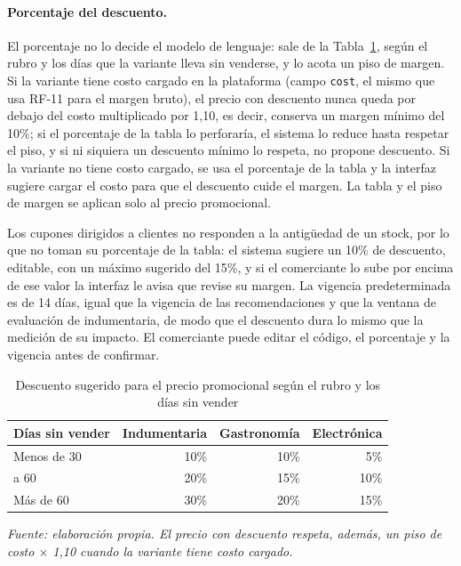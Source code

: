 \paragraph{Porcentaje del descuento.} El porcentaje no lo decide el modelo de lenguaje: sale de la Tabla~\ref{tab:motor-descuentos}, según el rubro y los días que la variante lleva sin venderse, y lo acota un piso de margen. Si la variante tiene costo cargado en la plataforma (campo \texttt{cost}, el mismo que usa RF-11 para el margen bruto), el precio con descuento nunca queda por debajo del costo multiplicado por 1,10, es decir, conserva un margen mínimo del 10\%; si el porcentaje de la tabla lo perforaría, el sistema lo reduce hasta respetar el piso, y si ni siquiera un descuento mínimo lo respeta, no propone descuento. Si la variante no tiene costo cargado, se usa el porcentaje de la tabla y la interfaz sugiere cargar el costo para que el descuento cuide el margen. La tabla y el piso de margen se aplican solo al precio promocional.

Los cupones dirigidos a clientes no responden a la antigüedad de un stock, por lo que no toman su porcentaje de la tabla: el sistema sugiere un 10\% de descuento, editable, con un máximo sugerido del 15\%, y si el comerciante lo sube por encima de ese valor la interfaz le avisa que revise su margen. La vigencia predeterminada es de 14 días, igual que la vigencia de las recomendaciones y que la ventana de evaluación de indumentaria, de modo que el descuento dura lo mismo que la medición de su impacto. El comerciante puede editar el código, el porcentaje y la vigencia antes de confirmar.

\begin{table}[!htbp]
\centering
\caption{Descuento sugerido para el precio promocional según el rubro y los días sin vender}
\label{tab:motor-descuentos}
\renewcommand{\arraystretch}{1.3}
\footnotesize
\setlength{\tabcolsep}{4pt}
\begin{tabular}{|>{\raggedright\arraybackslash}m{4.2cm}|r|r|r|}
\hline
\textbf{Días sin vender} & \textbf{Indumentaria} & \textbf{Gastronomía} & \textbf{Electrónica} \\
\hline
Menos de 30 & 10\% & 10\% & 5\% \\
\hline
30 a 60 & 20\% & 15\% & 10\% \\
\hline
Más de 60 & 30\% & 20\% & 15\% \\
\hline
\end{tabular}

\smallskip
\noindent\textit{Fuente: elaboración propia. El precio con descuento respeta, además, un piso de costo $\times$ 1,10 cuando la variante tiene costo cargado.}
\end{table}

